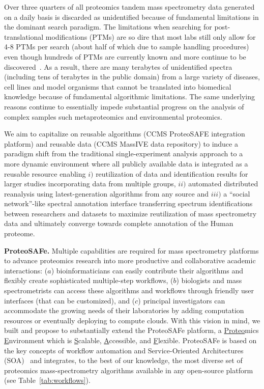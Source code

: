 \documentclass[arial,11pt]{article}
\newcommand{\SF}[1]{\textsf{#1}}
\newcommand{\SYSTEM}[0]{\SF{ProteoSAFe}\xspace}
\begin{document}

Over three quarters of all proteomics tandem mass spectrometry data generated on a daily basis is discarded as unidentified because of fundamental limitations in the dominant search paradigm. The limitations when searching for post-translational modifications (PTMs) are so dire that most labs still only allow for 4-8 PTMs per search (about half of which due to sample handling procedures) even though hundreds of PTMs are currently known and more continue to be discovered~\cite{peng11}. As a result, there are many terabytes of unidentified spectra (including tens of terabytes in the public domain) from a large variety of diseases, cell lines and model organisms that cannot be translated into biomedical knowledge because of fundamental algorithmic limitations. The same underlying reasons continue to essentially impede substantial progress on the analysis of complex samples such metaproteomics and environmental proteomics.

We aim to capitalize on reusable algorithms (CCMS ProteoSAFE integration platform) and reusable data (CCMS MassIVE data repository) to induce a paradigm shift from the traditional single-experiment analysis approach to a more dynamic environment where all publicly available data is integrated as a reusable resource enabling $i)$ reutilization of data and identification results for larger studies incorporating data from multiple groups, $ii)$ automated distributed reanalysis using latest-generation algorithms from any source and $iii)$ a ``social network''-like spectral annotation interface transferring spectrum identifications between researchers and datasets to maximize reutilization of mass spectrometry data and ultimately converge towards complete annotation of the Human proteome.

{\bf ProteoSAFe.} Multiple capabilities are required for mass spectrometry platforms to advance proteomics research into more productive and collaborative academic interactions: ($a$) bioinformaticians can easily contribute their algorithms and flexibly create sophisticated multiple-step workflows, ($b$) biologists and mass spectrometrists can access these algorithms and workflows through friendly user interfaces (that can be customized), and ($c$) principal investigators can accommodate the growing needs of their laboratories by adding computation resources or eventually deploying to compute clouds.
%
With this vision in mind, we built and propose to substantially extend the \SYSTEM platform, a \underline{Proteo}mics \underline{E}nvironment which is \underline{S}calable, \underline{A}ccessible, and \underline{F}lexible.
%
\SYSTEM is based on the key concepts of workflow automation and Service-Oriented Architectures (SOA)~\cite{Arrott:2007,Ermagan:2007} and integrates, to the best of our knowledge, the most diverse set of proteomics mass-spectrometry algorithms available in any open-source platform (see Table~\ref{tab:workflows}).
\end{document}
